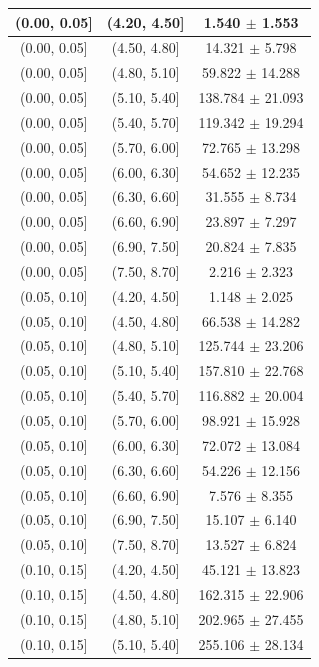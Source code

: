 \begin{longtable}{|c|c|c|}
\hline
\endlastfoot
(0.00, 0.05] & (4.20, 4.50] & 1.540 $\pm$ 1.553 \\ 
\hline
(0.00, 0.05] & (4.50, 4.80] & 14.321 $\pm$ 5.798 \\ 
\hline
(0.00, 0.05] & (4.80, 5.10] & 59.822 $\pm$ 14.288 \\ 
\hline
(0.00, 0.05] & (5.10, 5.40] & 138.784 $\pm$ 21.093 \\ 
\hline
(0.00, 0.05] & (5.40, 5.70] & 119.342 $\pm$ 19.294 \\ 
\hline
(0.00, 0.05] & (5.70, 6.00] & 72.765 $\pm$ 13.298 \\ 
\hline
(0.00, 0.05] & (6.00, 6.30] & 54.652 $\pm$ 12.235 \\ 
\hline
(0.00, 0.05] & (6.30, 6.60] & 31.555 $\pm$ 8.734 \\ 
\hline
(0.00, 0.05] & (6.60, 6.90] & 23.897 $\pm$ 7.297 \\ 
\hline
(0.00, 0.05] & (6.90, 7.50] & 20.824 $\pm$ 7.835 \\ 
\hline
(0.00, 0.05] & (7.50, 8.70] & 2.216 $\pm$ 2.323 \\ 
\hline
(0.05, 0.10] & (4.20, 4.50] & 1.148 $\pm$ 2.025 \\ 
\hline
(0.05, 0.10] & (4.50, 4.80] & 66.538 $\pm$ 14.282 \\ 
\hline
(0.05, 0.10] & (4.80, 5.10] & 125.744 $\pm$ 23.206 \\ 
\hline
(0.05, 0.10] & (5.10, 5.40] & 157.810 $\pm$ 22.768 \\ 
\hline
(0.05, 0.10] & (5.40, 5.70] & 116.882 $\pm$ 20.004 \\ 
\hline
(0.05, 0.10] & (5.70, 6.00] & 98.921 $\pm$ 15.928 \\ 
\hline
(0.05, 0.10] & (6.00, 6.30] & 72.072 $\pm$ 13.084 \\ 
\hline
(0.05, 0.10] & (6.30, 6.60] & 54.226 $\pm$ 12.156 \\ 
\hline
(0.05, 0.10] & (6.60, 6.90] & 7.576 $\pm$ 8.355 \\ 
\hline
(0.05, 0.10] & (6.90, 7.50] & 15.107 $\pm$ 6.140 \\ 
\hline
(0.05, 0.10] & (7.50, 8.70] & 13.527 $\pm$ 6.824 \\ 
\hline
(0.10, 0.15] & (4.20, 4.50] & 45.121 $\pm$ 13.823 \\ 
\hline
(0.10, 0.15] & (4.50, 4.80] & 162.315 $\pm$ 22.906 \\ 
\hline
(0.10, 0.15] & (4.80, 5.10] & 202.965 $\pm$ 27.455 \\ 
\hline
(0.10, 0.15] & (5.10, 5.40] & 255.106 $\pm$ 28.134 \\ 

\end{longtable}

